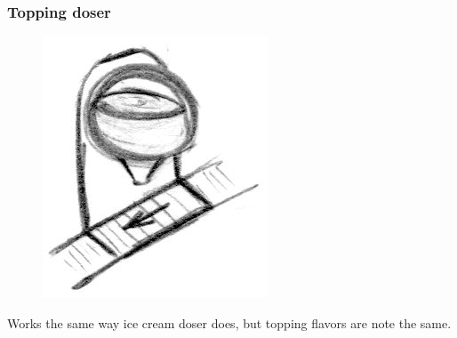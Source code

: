 \documentclass[a4paper]{scrartcl}
\begin{document}
        \subsubsection{Topping doser}
            \begin{minipage}[t][6em][t]{\textwidth}
                \begin{figure}
                    \vspace{-20pt}
                    \includegraphics[scale=1]{devices/topping_doser}
                    \vspace{-10pt}
                \end{figure}

                Works the same way ice cream doser does, but topping flavors are
                note the same.
            \end{minipage}
\end{document}
